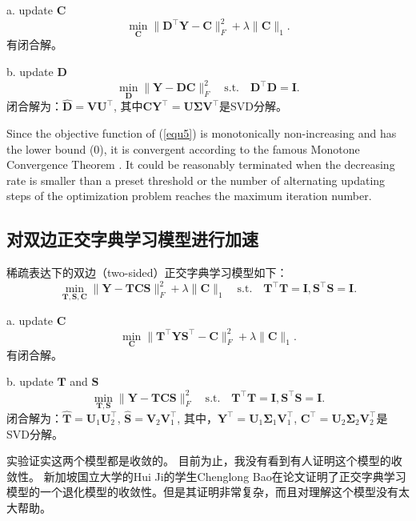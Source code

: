 \documentclass[10pt,twocolumn,letterpaper]{article}
\begin{document}
a. update $\bm{C}$
\begin{equation}
\min_{\bm{C}}\|\bm{D}^{\top}\bm{Y}-\bm{C}\|_{F}^{2}
+
\lambda\|\bm{C}\|_{1}.
\end{equation}
有闭合解。

b. update $\bm{D}$
\begin{equation}
\min_{\bm{D}}\|\bm{Y}-\bm{D}\bm{C}\|_{F}^{2}
\quad
\text{s.t.}
\quad
\bm{D}^{\top}\bm{D} =\bm{I}. 
\end{equation}
闭合解为：$\hat{\bm{D}}=\bm{V}\bm{U}^{\top}$, 其中$\bm{C}\bm{Y}^{\top}=\bm{U}\bm{\Sigma}\bm{V}^{\top}$是SVD分解。


Since the objective function of (\ref{equ5}) is monotonically non-increasing and has the lower bound (0), it is convergent according to the famous Monotone Convergence Theorem \cite{stein2009real}. It could be reasonably terminated when the decreasing rate is smaller than a preset threshold or the number of alternating updating steps of the optimization problem reaches the maximum iteration number. 

\subsection{对双边正交字典学习模型进行加速}

稀疏表达下的双边（two-sided）正交字典学习模型如下：
\begin{equation}\label{equ5}
\min_{\bm{T},\bm{S},\bm{C}}\|\bm{Y}-\bm{T}\bm{C}\bm{S}\|_{F}^{2}
+
\lambda\|\bm{C}\|_{1}
\quad
\text{s.t.}
\quad
\bm{T}^{\top}\bm{T} =\bm{I},
\bm{S}^{\top}\bm{S} =\bm{I}. 
\end{equation}


a. update $\bm{C}$
\begin{equation}
\min_{\bm{C}}\|\bm{T}^{\top}\bm{Y}\bm{S}^{\top}-\bm{C}\|_{F}^{2}
+
\lambda\|\bm{C}\|_{1}.
\end{equation}
有闭合解。

b. update $\bm{T}$ and $\bm{S}$
\begin{equation}\label{equ5}
\min_{\bm{T},\bm{S}}\|\bm{Y}-\bm{T}\bm{C}\bm{S}\|_{F}^{2}
\quad
\text{s.t.}
\quad
\bm{T}^{\top}\bm{T} =\bm{I},
\bm{S}^{\top}\bm{S} =\bm{I}. 
\end{equation}
闭合解为：$\hat{\bm{T}}=\bm{U}_{1}\bm{U}_{2}^{\top}$, $\hat{\bm{S}}=\bm{V}_{2}\bm{V}_{1}^{\top}$,
其中，$\bm{Y}^{\top}=\bm{U}_{1}\bm{\Sigma}_{1}\bm{V}_{1}^{\top}$,
$\bm{C}^{\top}=\bm{U}_{2}\bm{\Sigma}_{2}\bm{V}_{2}^{\top}$是SVD分解。

实验证实这两个模型都是收敛的。
目前为止，我没有看到有人证明这个模型的收敛性。
新加坡国立大学的Hui Ji的学生Chenglong Bao在论文\cite{bao2014convergent,bao2014l0,bao2016dictionary}证明了正交字典学习模型的一个退化模型的收敛性。但是其证明非常复杂，而且对理解这个模型没有太大帮助。
\end{document}
